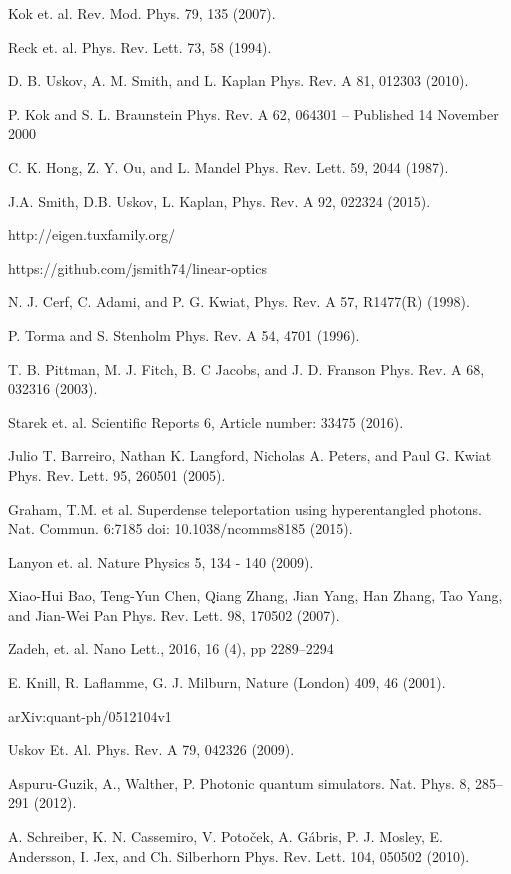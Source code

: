 \documentclass[aps,pra,twocolumn,showpacs,superscriptaddress,floatfix,10pt]{revtex4}
\begin{document}
\begin{thebibliography}{99}

 Kok et. al. Rev. Mod. Phys. 79, 135 (2007).

 Reck et. al. Phys. Rev. Lett. 73, 58 (1994).

 D. B. Uskov, A. M. Smith, and L. Kaplan
Phys. Rev. A 81, 012303 (2010).

 P. Kok and S. L. Braunstein Phys. Rev. A 62, 064301 – Published 14 November 2000

 C. K. Hong, Z. Y. Ou, and L. Mandel Phys. Rev. Lett. 59, 2044 (1987).

 J.A. Smith, D.B. Uskov, L. Kaplan, Phys. Rev. A 92, 022324 (2015).

 http://eigen.tuxfamily.org/

 https://github.com/jsmith74/linear-optics

 N. J. Cerf, C. Adami, and P. G. Kwiat, Phys. Rev. A 57, R1477(R) (1998).

 P. Torma and S. Stenholm Phys. Rev. A 54, 4701 (1996).

 T. B. Pittman, M. J. Fitch, B. C Jacobs, and J. D. Franson
Phys. Rev. A 68, 032316 (2003).

 Starek et. al. Scientific Reports 6, Article number: 33475 (2016).

 Julio T. Barreiro, Nathan K. Langford, Nicholas A. Peters, and Paul G. Kwiat
Phys. Rev. Lett. 95, 260501 (2005).

 Graham, T.M. et al. Superdense teleportation using hyperentangled photons. Nat. Commun. 6:7185 doi: 10.1038/ncomms8185 (2015).

 Lanyon et. al. Nature Physics 5, 134 - 140 (2009).

 Xiao-Hui Bao, Teng-Yun Chen, Qiang Zhang, Jian Yang, Han Zhang, Tao Yang, and Jian-Wei Pan
Phys. Rev. Lett. 98, 170502 (2007).

 Zadeh, et. al. Nano Lett., 2016, 16 (4), pp 2289–2294

  E. Knill, R. Laflamme, G. J. Milburn, Nature (London) 409, 46 (2001).

 arXiv:quant-ph/0512104v1 

 Uskov Et. Al. Phys. Rev. A 79, 042326 (2009).

 Aspuru-Guzik, A., Walther, P. Photonic quantum simulators. Nat. Phys. 8, 285–291 (2012).

 A. Schreiber, K. N. Cassemiro, V. Potoček, A. Gábris, P. J. Mosley, E. Andersson, I. Jex, and Ch. Silberhorn
Phys. Rev. Lett. 104, 050502 (2010).


\end{thebibliography}
\end{document}
